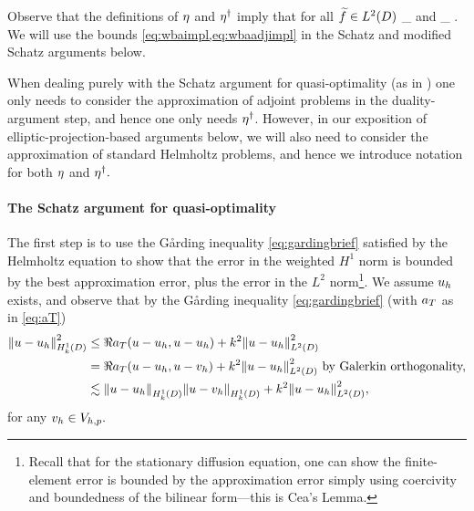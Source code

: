 Observe that the definitions of $\eta$ and $\eta^{\dagger}$ imply that for all $\ftilde \in \LtD$
\beq\label{eq:wbaimpl}
\inf_{\vh \in \Vhp} \NHokD{\solfem(\ftilde) - \vh} \leq \wba \NLtD{\ftilde}
\eeq
and
\beq\label{eq:wbaadjimpl}
\inf_{\vh \in \Vhp} \NHokD{\solfems(\ftilde) - \vh} \leq \wbaadj \NLtD{\ftilde}.
\eeq
We will use the bounds \cref{eq:wbaimpl,eq:wbaadjimpl} in the Schatz and modified Schatz arguments below.

When dealing purely with the Schatz argument for quasi-optimality (as in \cite[Section 2.2]{Sa:06}) one only needs to consider the approximation of adjoint problems in the duality-argument step, and hence one only needs $\eta^{\dagger}$. However, in our exposition of elliptic-projection-based arguments below, we will also need to consider the approximation of standard Helmholtz problems, and hence we introduce notation for both $\eta$ and $\eta^{\dagger}.$

 \paragraph{The Schatz argument for quasi-optimality} The first step is to use the G\r{a}rding inequality \cref{eq:gardingbrief} satisfied by the Helmholtz equation to show that the error in the weighted $H^1$ norm is bounded by the best approximation error, plus the error in the $L^2$ norm\footnote{Recall that for the stationary diffusion equation, one can show the finite-element error is bounded by the approximation error simply using coercivity and boundedness of the bilinear form---this is Cea's Lemma.}. We assume $u_{h}$ exists, and observe that by the G\r{a}rding inequality \cref{eq:gardingbrief} (with $a_{T}$ as in \cref{eq:aT})
\begin{align}
\NHokD{u-\uh}^2 &\leq \Re{\aT(u-\uh,u-\uh)} + k^2 \NLtD{u-\uh}^2\nonumber\\
&= \Re{\aT(u-\uh,u-\vh)} + k^2 \NLtD{u-\uh}^2\text{ by Galerkin orthogonality,}\nonumber\\
&\lesssim \NHokD{u-\uh}\NHokD{u-\vh} + k^2 \NLtD{u-\uh}^2,\label{eq:gardingerror}
\end{align}
for any $v_{h} \in V_{h,p}.$

